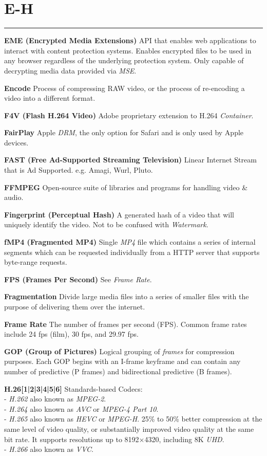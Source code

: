 \section{E-H}
\hrule

\medskip
\textbf{EME (Encrypted Media Extensions)}
API that enables web applications to interact with content protection systems. Enables encrypted files to be used in any browser regardless of the underlying protection system. Only capable of decrypting media data provided via \textit{MSE}.

\smallskip
\textbf{Encode}
Process of compressing RAW video, or the process of re-encoding a video into a different format.

\smallskip
\textbf{F4V (Flash H.264 Video)}
Adobe proprietary extension to H.264 \textit{Container}.

\smallskip
\textbf{FairPlay}
Apple \textit{DRM}, the only option for Safari and is only used by Apple devices.

\smallskip
\textbf{FAST (Free Ad-Supported Streaming Television)}
Linear Internet Stream that is Ad Supported.  e.g. Amagi, Wurl, Pluto.

\smallskip
\textbf{FFMPEG}
Open-source suite of libraries and programs for handling video \& audio.

\smallskip
\textbf{Fingerprint (Perceptual Hash)}
A generated hash of a video that will uniquely identify the video. Not to be confused with \textit{Watermark}.

\smallskip
\textbf{fMP4 (Fragmented MP4)}
Single \textit{MP4} file which contains a series of internal segments which can be requested individually from a HTTP server that supports byte-range requests.

\smallskip
\textbf{FPS (Frames Per Second)}
See \textit{Frame Rate}.

\smallskip
\textbf{Fragmentation}
Divide large media files into a series of smaller files with the purpose of delivering them over the internet.

\smallskip
\textbf{Frame Rate}
The number of frames per second (FPS). Common frame rates include 24 fps (film), 30 fps, and 29.97 fps.

\smallskip
\textbf{GOP (Group of Pictures)}
Logical grouping of \textit{frames} for compression purposes. Each GOP begins with an I-frame keyframe and can contain any number of predictive (P frames) and bidirectional predictive (B frames).

\smallskip
\textbf{H.26[1|2|3|4|5|6]}
Standards-based Codecs:\\
 - \textit{H.262} also known as \textit{MPEG-2}.\\
 - \textit{H.264} also known as \textit{AVC} or  \textit{MPEG-4 Part 10}.\\
 - \textit{H.265} also known as \textit{HEVC} or \textit{MPEG-H}. 25\% to 50\% better compression at the same level of video quality, or substantially improved video quality at the same bit rate. It supports resolutions up to 8192×4320, including 8K \textit{UHD}.\\
 - \textit{H.266} also known as \textit{VVC}.

